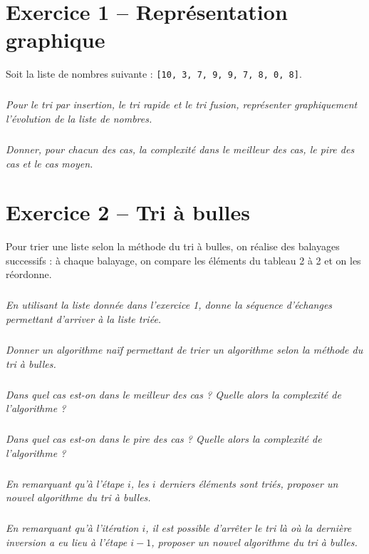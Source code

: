 \documentclass[10pt,fleqn]{article} %
\begin{document}

\vspace{8cm}
\pagestyle{fancy}
\thispagestyle{plain}


\def\columnseprulecolor{\color{ocre}}
\setlength{\columnseprule}{0.4pt} 
\begin{multicols}{2}

\section*{Exercice 1 -- Représentation graphique}
Soit la liste de nombres suivante : \texttt{[10, 3, 7, 9, 9, 7, 8, 0, 8]}.

\subparagraph{}
\textit{Pour le tri par insertion, le tri rapide et le tri fusion, représenter graphiquement l'évolution de la liste de nombres.}

\subparagraph{}
\textit{Donner, pour chacun des cas, la complexité dans le meilleur des cas, le pire des cas et le cas moyen.}

\section*{Exercice 2 -- Tri à bulles}
Pour trier une liste selon la méthode du tri à bulles, on réalise des balayages successifs : à chaque balayage, on compare les éléments du tableau 2 à 2 et on les réordonne. 
\setcounter{exo}{0}

\subparagraph{}
\textit{En utilisant la liste donnée dans l'exercice 1, donne la séquence d'échanges permettant d'arriver à la liste triée.}

\subparagraph{}
\textit{Donner un algorithme naïf permettant de trier un algorithme selon la méthode du tri à bulles.}
\ifprof
\begin{corrige}
\end{corrige}
\else
\fi


\subparagraph{}
\textit{Dans quel cas est-on dans le meilleur des cas ? Quelle alors la complexité de l'algorithme ?}

\subparagraph{}
\textit{Dans quel cas est-on dans le pire des cas ? Quelle alors la complexité de l'algorithme ?}


\subparagraph{}
\textit{En remarquant qu'à l'étape $i$, les $i$ derniers éléments sont triés, proposer un nouvel algorithme du tri à bulles.}

\subparagraph{}
\textit{En remarquant qu'à l'itération $i$, il est possible d'arrêter le tri là où la dernière inversion a eu lieu à l'étape $i-1$, proposer un nouvel algorithme du tri à bulles.}


\end{multicols}
\end{document}
